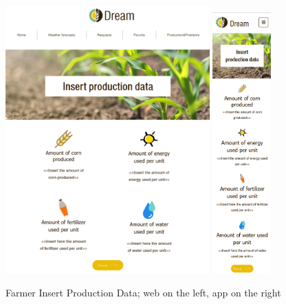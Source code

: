 \documentclass{article}
\begin{document}
        \begin{figure} [h]
            \centering
            \includegraphics[width=0.7\textwidth]{images/UserInterfaces/Farmer/ProductionAndProblems/InsertsProductionDataWeb.png}
            \quad
            \includegraphics[width=0.2\textwidth]{images/UserInterfaces/Farmer/ProductionAndProblems/InsertProductionDataApp.png}
            \quad
            \caption{\label{fig:farmerInsertProduction}Farmer Insert Production Data; web on the left, app on the right}
        \end{figure}
\end{document}
